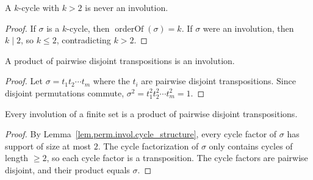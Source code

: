 \begin{lemma}
\label{lem.perm.invol.not_cycle_gt_two}
\leanhelper
\leanok
A $k$-cycle with $k > 2$ is never an involution.
\end{lemma}

\begin{proof}
\leanok
If $\sigma$ is a $k$-cycle, then $\operatorname{orderOf}(\sigma) = k$.
If $\sigma$ were an involution, then $k \mid 2$, so $k \leq 2$,
contradicting $k > 2$.
\end{proof}

\begin{lemma}
\label{lem.perm.invol.disjoint_transpositions}
\leanhelper
\leanok
A product of pairwise disjoint transpositions is an involution.
\end{lemma}

\begin{proof}
\leanok
Let $\sigma = t_1 t_2 \cdots t_m$ where the $t_i$ are pairwise disjoint transpositions.
Since disjoint permutations commute, $\sigma^2 = t_1^2 t_2^2 \cdots t_m^2 = 1$.
\end{proof}

\begin{lemma}
\label{lem.perm.invol.is_product_of_disjoint_transpositions}
\leanhelper
\leanok
Every involution of a finite set is a product of pairwise disjoint transpositions.
\end{lemma}

\begin{proof}
\leanok
By Lemma~\ref{lem.perm.invol.cycle_structure}, every cycle factor of $\sigma$ has
support of size at most $2$.  The cycle factorization of $\sigma$ only contains
cycles of length $\geq 2$, so each cycle factor is a transposition.
The cycle factors are pairwise disjoint, and their product equals $\sigma$.
\end{proof}
